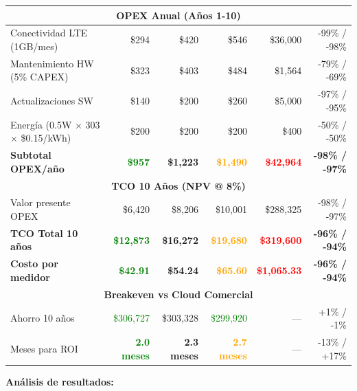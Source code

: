 \begin{table}[H]
{\begin{tabular}{|l|r|r|r|r|r|}
\hline
\multicolumn{6}{|c|}{\cellcolor{blue!10}\textbf{OPEX Anual (Años 1-10)}} \\
\hline
Conectividad LTE (1GB/mes) & \$294 & \$420 & \$546 & \$36,000 & -99\% / -98\% \\
Mantenimiento HW (5\% CAPEX) & \$323 & \$403 & \$484 & \$1,564 & -79\% / -69\% \\
Actualizaciones SW & \$140 & \$200 & \$260 & \$5,000 & -97\% / -95\% \\
Energía (0.5W $\times$ 303 $\times$ \$0.15/kWh) & \$200 & \$200 & \$200 & \$400 & -50\% / -50\% \\
\hline
\textbf{Subtotal OPEX/año} & \textcolor{green}{\textbf{\$957}} & \textbf{\$1,223} & \textcolor{orange}{\textbf{\$1,490}} & \textcolor{red}{\textbf{\$42,964}} & \textbf{-98\% / -97\%} \\
\hline
\multicolumn{6}{|c|}{\cellcolor{yellow!20}\textbf{TCO 10 Años (NPV @ 8\%)}} \\
\hline
Valor presente OPEX & \$6,420 & \$8,206 & \$10,001 & \$288,325 & -98\% / -97\% \\
\textbf{TCO Total 10 años} & \textcolor{green}{\textbf{\$12,873}} & \textbf{\$16,272} & \textcolor{orange}{\textbf{\$19,680}} & \textcolor{red}{\textbf{\$319,600}} & \textbf{-96\% / -94\%} \\
\hline
\textbf{Costo por medidor} & \textcolor{green}{\textbf{\$42.91}} & \textbf{\$54.24} & \textcolor{orange}{\textbf{\$65.60}} & \textcolor{red}{\textbf{\$1,065.33}} & \textbf{-96\% / -94\%} \\
\hline
\multicolumn{6}{|c|}{\cellcolor{green!10}\textbf{Breakeven vs Cloud Comercial}} \\
\hline
Ahorro 10 años & \textcolor{green}{\$306,727} & \$303,328 & \textcolor{green}{\$299,920} & --- & +1\% / -1\% \\
Meses para ROI & \textcolor{green}{\textbf{2.0 meses}} & \textbf{2.3 meses} & \textcolor{orange}{\textbf{2.7 meses}} & --- & -13\% / +17\% \\
\hline
\end{tabular}%
}
\end{table}

\textbf{Análisis de resultados:}

